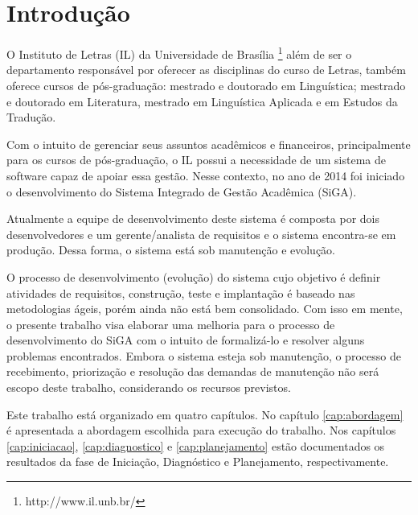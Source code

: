 \chapter{Introdução}

O Instituto de Letras (IL) da Universidade de Brasília \footnote{http://www.il.unb.br/} além de ser o departamento responsável por oferecer as disciplinas do
curso de Letras, também oferece cursos de pós-graduação: mestrado e doutorado em Linguística; mestrado e doutorado em Literatura, 
mestrado em Linguística Aplicada e em Estudos da Tradução. 

Com o intuito de gerenciar seus assuntos acadêmicos e financeiros, principalmente para os cursos de pós-graduação, o IL 
possui a necessidade de um sistema de software capaz de apoiar essa gestão. Nesse contexto, no ano de 2014 foi iniciado o 
desenvolvimento do Sistema Integrado de Gestão Acadêmica (SiGA).

Atualmente a equipe de desenvolvimento deste sistema é composta por dois desenvolvedores e um gerente/analista
de requisitos e o sistema encontra-se em produção. Dessa forma, o sistema está sob manutenção e evolução.

O processo de desenvolvimento (evolução) do sistema cujo objetivo é definir atividades de requisitos, construção, teste e implantação 
é baseado nas metodologias ágeis, porém ainda não está bem consolidado. Com isso em mente, o presente trabalho visa elaborar uma melhoria para o processo de desenvolvimento
do SiGA com o intuito de formalizá-lo e resolver alguns problemas encontrados. Embora o sistema esteja sob manutenção, o processo
de recebimento, priorização e resolução das demandas de manutenção não será escopo deste trabalho, considerando os recursos previstos.

Este trabalho está organizado em quatro capítulos. No capítulo \ref{cap:abordagem} é apresentada a abordagem escolhida
para execução do trabalho. Nos capítulos \ref{cap:iniciacao}, \ref{cap:diagnostico} e \ref{cap:planejamento}
estão documentados os resultados da fase de Iniciação, Diagnóstico e Planejamento, respectivamente.
